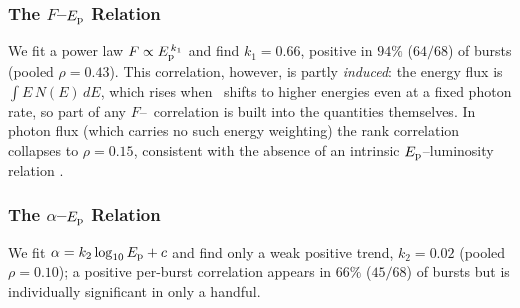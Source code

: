 \subsubsection{The $F$--$E_{\rm p}$ Relation}
We fit a power law $F\propto E_{\rm p}^{\,k_1}$ and find $k_1=0.66$, positive in $94\%$
($64/68$) of bursts (pooled $\rho=0.43$). This correlation, however, is partly
\emph{induced}: the energy flux is $\int E\,N(E)\,dE$, which rises when \Ep\
shifts to higher energies even at a fixed photon rate, so part of any
$F$--\Ep\ correlation is built into the quantities themselves. In photon flux
(which carries no such energy weighting) the rank correlation collapses to
$\rho=0.15$, consistent with the absence of an intrinsic $E_{\rm p}$--luminosity
relation \citep{Mei2025}.

\subsubsection{The $\alpha$--$E_{\rm p}$ Relation}
We fit $\alpha=k_2\log_{10}E_{\rm p}+c$ and find only a weak positive trend,
$k_2=0.02$ (pooled $\rho=0.10$); a positive per-burst correlation appears in
$66\%$ ($45/68$) of bursts but is individually significant in only a handful.

